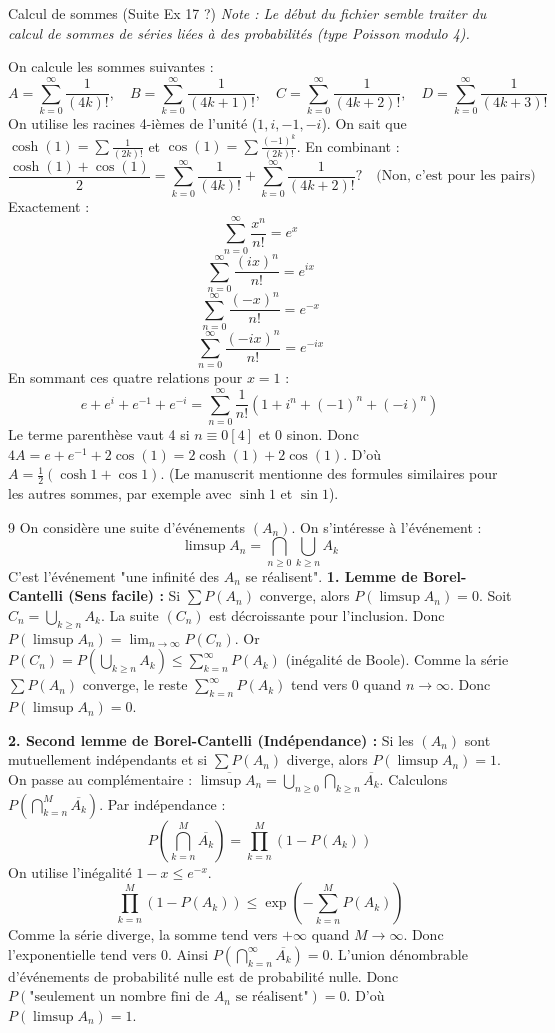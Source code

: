 \begin{correction}{Calcul de sommes (Suite Ex 17 ?)}
\textit{Note : Le début du fichier semble traiter du calcul de sommes de séries liées à des probabilités (type Poisson modulo 4).}

On calcule les sommes suivantes :
$$ A = \sum_{k=0}^\infty \frac{1}{(4k)!}, \quad B = \sum_{k=0}^\infty \frac{1}{(4k+1)!}, \quad C = \sum_{k=0}^\infty \frac{1}{(4k+2)!}, \quad D = \sum_{k=0}^\infty \frac{1}{(4k+3)!} $$
On utilise les racines 4-ièmes de l'unité ($1, i, -1, -i$).
On sait que $\cosh(1) = \sum \frac{1}{(2k)!}$ et $\cos(1) = \sum \frac{(-1)^k}{(2k)!}$.
En combinant :
$$ \frac{\cosh(1) + \cos(1)}{2} = \sum_{k=0}^\infty \frac{1}{(4k)!} + \sum_{k=0}^\infty \frac{1}{(4k+2)!}? \quad \text{(Non, c'est pour les pairs)} $$
Exactement :
$$ \sum_{n=0}^\infty \frac{x^n}{n!} = e^x $$
$$ \sum_{n=0}^\infty \frac{(ix)^n}{n!} = e^{ix} $$
$$ \sum_{n=0}^\infty \frac{(-x)^n}{n!} = e^{-x} $$
$$ \sum_{n=0}^\infty \frac{(-ix)^n}{n!} = e^{-ix} $$
En sommant ces quatre relations pour $x=1$ :
$$ e + e^i + e^{-1} + e^{-i} = \sum_{n=0}^\infty \frac{1}{n!} (1 + i^n + (-1)^n + (-i)^n) $$
Le terme parenthèse vaut 4 si $n \equiv 0 [4]$ et 0 sinon.
Donc $4A = e + e^{-1} + 2\cos(1) = 2\cosh(1) + 2\cos(1)$.
D'où $A = \frac{1}{2}(\cosh 1 + \cos 1)$.
(Le manuscrit mentionne des formules similaires pour les autres sommes, par exemple avec $\sinh 1$ et $\sin 1$).
\end{correction}

\begin{correction}{9}
On considère une suite d'événements $(A_n)$. On s'intéresse à l'événement :
$$ \limsup A_n = \bigcap_{n \ge 0} \bigcup_{k \ge n} A_k $$
C'est l'événement "une infinité des $A_n$ se réalisent".
\textbf{1. Lemme de Borel-Cantelli (Sens facile) :}
Si $\sum P(A_n)$ converge, alors $P(\limsup A_n) = 0$.
Soit $C_n = \bigcup_{k \ge n} A_k$. La suite $(C_n)$ est décroissante pour l'inclusion.
Donc $P(\limsup A_n) = \lim_{n \to \infty} P(C_n)$.
Or $P(C_n) = P(\bigcup_{k \ge n} A_k) \le \sum_{k=n}^\infty P(A_k)$ (inégalité de Boole).
Comme la série $\sum P(A_n)$ converge, le reste $\sum_{k=n}^\infty P(A_k)$ tend vers 0 quand $n \to \infty$.
Donc $P(\limsup A_n) = 0$.

\textbf{2. Second lemme de Borel-Cantelli (Indépendance) :}
Si les $(A_n)$ sont mutuellement indépendants et si $\sum P(A_n)$ diverge, alors $P(\limsup A_n) = 1$.
On passe au complémentaire : $\overline{\limsup A_n} = \bigcup_{n \ge 0} \bigcap_{k \ge n} \overline{A_k}$.
Calculons $P(\bigcap_{k=n}^M \overline{A_k})$. Par indépendance :
$$ P(\bigcap_{k=n}^M \overline{A_k}) = \prod_{k=n}^M (1 - P(A_k)) $$
On utilise l'inégalité $1-x \le e^{-x}$.
$$ \prod_{k=n}^M (1 - P(A_k)) \le \exp\left( - \sum_{k=n}^M P(A_k) \right) $$
Comme la série diverge, la somme tend vers $+\infty$ quand $M \to \infty$. Donc l'exponentielle tend vers 0.
Ainsi $P(\bigcap_{k=n}^\infty \overline{A_k}) = 0$.
L'union dénombrable d'événements de probabilité nulle est de probabilité nulle.
Donc $P(\text{"seulement un nombre fini de } A_n \text{ se réalisent"}) = 0$.
D'où $P(\limsup A_n) = 1$.
\end{correction}

